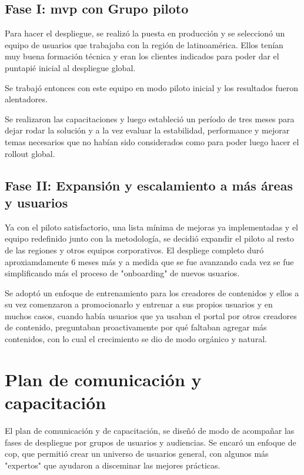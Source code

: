 \subsection{Fase I: \gls{mvp} con Grupo piloto}
    
Para hacer el despliegue, se realizó la puesta en producción y se seleccionó un equipo de usuarios que trabajaba con la región de latinoamérica. Ellos tenían muy buena formación técnica y eran los clientes indicados para poder dar el puntapié inicial al despliegue global.

Se trabajó entonces con este equipo en modo piloto inicial y los resultados fueron alentadores. 

Se realizaron las capacitaciones y luego estableció un período de tres meses para dejar rodar la solución y a la vez evaluar la estabilidad, performance y mejorar temas necesarios que no habían sido considerados como para poder luego hacer el rollout global.

\subsection{Fase II: Expansión y escalamiento a más áreas y usuarios}

Ya con el piloto satisfactorio, una lista mínima de mejoras ya implementadas y el equipo redefinido junto con la metodología, se decidió expandir el piloto al resto de las regiones y otros equipos corporativos. El despliege completo duró aproxiamdamente 6 meses más y a medida que se fue avanzando cada vez se fue simplificando más el proceso de "onboarding" de nuevos usuarios.

Se adoptó un enfoque de entrenamiento para los creadores de contenidos y ellos a su vez comenzaron a promocionarlo y entrenar a sus propios usuarios y en muchos casos, cuando había usuarios que ya usaban el portal por otros creadores de contenido, preguntaban proactivamente por qué faltaban agregar más contenidos, con lo cual el crecimiento se dio de modo orgánico y natural.

\section{Plan de comunicación y capacitación}
El plan de comunicación y de capacitación, se diseñó de modo de acompañar las fases de despliegue por grupos de usuarios y audiencias. Se encaró un enfoque de \gls{cop}, que permitió crear un universo de usuarios general, con algunos más "expertos" que ayudaron a disceminar las mejores prácticas. 

